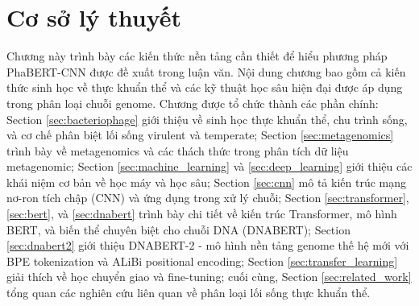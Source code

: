 \chapter{Cơ sở lý thuyết}
\label{chap:theory}

Chương này trình bày các kiến thức nền tảng cần thiết để hiểu phương pháp PhaBERT-CNN được đề xuất trong luận văn. Nội dung chương bao gồm cả kiến thức sinh học về thực khuẩn thể và các kỹ thuật học sâu hiện đại được áp dụng trong phân loại chuỗi genome. Chương được tổ chức thành các phần chính: Section \ref{sec:bacteriophage} giới thiệu về sinh học thực khuẩn thể, chu trình sống, và cơ chế phân biệt lối sống virulent và temperate; Section \ref{sec:metagenomics} trình bày về metagenomics và các thách thức trong phân tích dữ liệu metagenomic; Section \ref{sec:machine_learning} và \ref{sec:deep_learning} giới thiệu các khái niệm cơ bản về học máy và học sâu; Section \ref{sec:cnn} mô tả kiến trúc mạng nơ-ron tích chập (CNN) và ứng dụng trong xử lý chuỗi; Section \ref{sec:transformer}, \ref{sec:bert}, và \ref{sec:dnabert} trình bày chi tiết về kiến trúc Transformer, mô hình BERT, và biến thể chuyên biệt cho chuỗi DNA (DNABERT); Section \ref{sec:dnabert2} giới thiệu DNABERT-2 - mô hình nền tảng genome thế hệ mới với BPE tokenization và ALiBi positional encoding; Section \ref{sec:transfer_learning} giải thích về học chuyển giao và fine-tuning; cuối cùng, Section \ref{sec:related_work} tổng quan các nghiên cứu liên quan về phân loại lối sống thực khuẩn thể.












